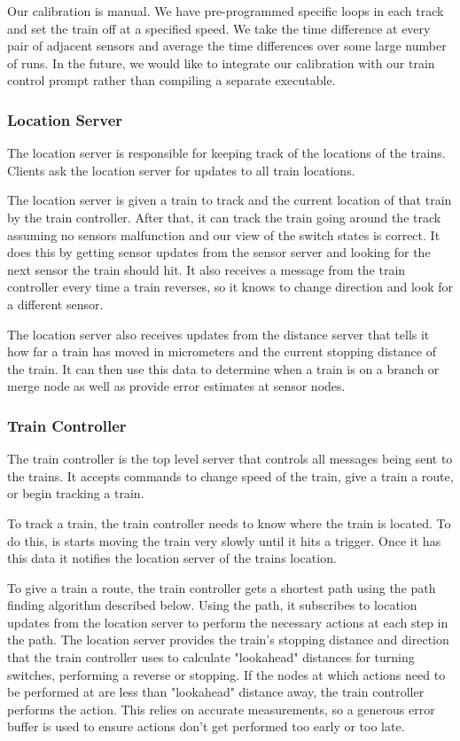 \documentclass[letterpaper]{article}
\begin{document}
Our calibration is manual. We have pre-programmed specific loops in each track and set the train off at a specified speed. We take the time difference at every pair of adjacent sensors and average the time differences over some large number of runs. In the future, we would like to integrate our calibration with our train control prompt rather than compiling a separate executable.

\subsubsection{Location Server}

The location server is responsible for keeping track of the locations of the trains. Clients ask the location server for updates to all train locations.

The location server is given a train to track and the current location of that train by the train controller. After that, it can track the train going around the track assuming no sensors malfunction and our view of the switch states is correct. It does this by getting sensor updates from the sensor server and looking for the next sensor the train should hit. It also receives a message from the train controller every time a train reverses, so it knows to change direction and look for a different sensor.

The location server also receives updates from the distance server that tells it how far a train has moved in micrometers and the current stopping distance of the train. It can then use this data to determine when a train is on a branch or merge node as well as provide error estimates at sensor nodes.

\subsubsection{Train Controller}

The train controller is the top level server that controls all messages being sent to the trains. It accepts commands to change speed of the train, give a train a route, or begin tracking a train.

To track a train, the train controller needs to know where the train is located. To do this, is starts moving the train very slowly until it hits a trigger. Once it has this data it notifies the location server of the trains location.

To give a train a route, the train controller gets a shortest path using the path finding algorithm described below. Using the path, it subscribes to location updates from the location server to perform the necessary actions at each step in the path. The location server provides the train's stopping distance and direction that the train controller uses to calculate "lookahead" distances for turning switches, performing a reverse or stopping. If the nodes at which actions need to be performed at are less than "lookahead" distance away, the train controller performs the action. This relies on accurate measurements, so a generous error buffer is used to ensure actions don't get performed too early or too late.
\end{document}
